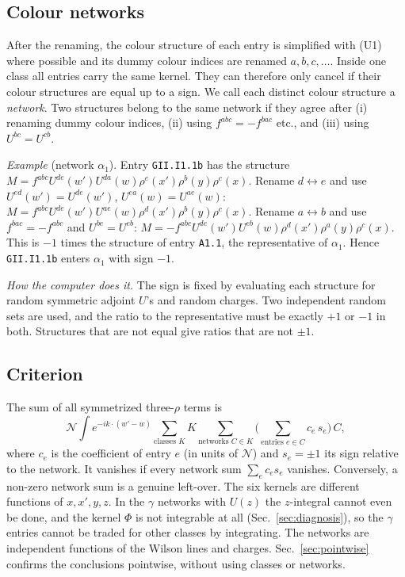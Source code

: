 \documentclass[10pt]{article}
\numberwithin{equation}{section}
\newcommand{\NN}{\mathcal N}
\newcommand{\lab}[1]{\texttt{#1}}
\begin{document}
\subsection{Colour networks}\label{sec:colour}
After the renaming, the colour structure of each entry is simplified with (U1) where possible and its dummy colour indices are renamed $a,b,c,\dots$. Inside one class all entries carry the same kernel. They can therefore only cancel if their colour structures are equal up to a sign. We call each distinct colour structure a \emph{network}. Two structures belong to the same network if they agree after (i) renaming dummy colour indices, (ii) using $f^{abc}=-f^{bac}$ etc., and (iii) using $U^{bc}=U^{cb}$.

\emph{Example} (network $\alpha_1$). Entry \lab{GII.I1.1b} has the structure $M=f^{abc}U^{de}(w')U^{da}(w)\rho^e(x')\rho^b(y)\rho^c(x)$. Rename $d\leftrightarrow e$ and use $U^{ed}(w')=U^{de}(w')$, $U^{ea}(w)=U^{ae}(w)$: $M=f^{abc}U^{de}(w')U^{ae}(w)\rho^d(x')\rho^b(y)\rho^c(x)$. Rename $a\leftrightarrow b$ and use $f^{bac}=-f^{abc}$ and $U^{be}=U^{eb}$: $M=-f^{abc}U^{de}(w')U^{eb}(w)\rho^d(x')\rho^a(y)\rho^c(x)$. This is $-1$ times the structure of entry \lab{A1.1}, the representative of $\alpha_1$. Hence \lab{GII.I1.1b} enters $\alpha_1$ with sign $-1$.

\emph{How the computer does it.} The sign is fixed by evaluating each structure for random symmetric adjoint $U$'s and random charges. Two independent random sets are used, and the ratio to the representative must be exactly $+1$ or $-1$ in both. Structures that are not equal give ratios that are not $\pm1$.

\subsection{Criterion}\label{sec:criterion}
The sum of all symmetrized three-$\rho$ terms is
\begin{equation}
\NN\int e^{-ik\cdot(w'-w)}\sum_{\text{classes }K}K\sum_{\text{networks }C\in K}\Big(\sum_{\text{entries }e\in C}c_e\,s_e\Big)\,C,
\end{equation}
where $c_e$ is the coefficient of entry $e$ (in units of $\NN$) and $s_e=\pm1$ its sign relative to the network. It vanishes if every network sum $\sum_e c_es_e$ vanishes. Conversely, a non-zero network sum is a genuine left-over. The six kernels are different functions of $x,x',y,z$. In the $\gamma$ networks with $U(z)$ the $z$-integral cannot even be done, and the kernel $\Phi$ is not integrable at all (Sec.~\ref{sec:diagnosis}), so the $\gamma$ entries cannot be traded for other classes by integrating. The networks are independent functions of the Wilson lines and charges. Sec.~\ref{sec:pointwise} confirms the conclusions pointwise, without using classes or networks.
\end{document}
